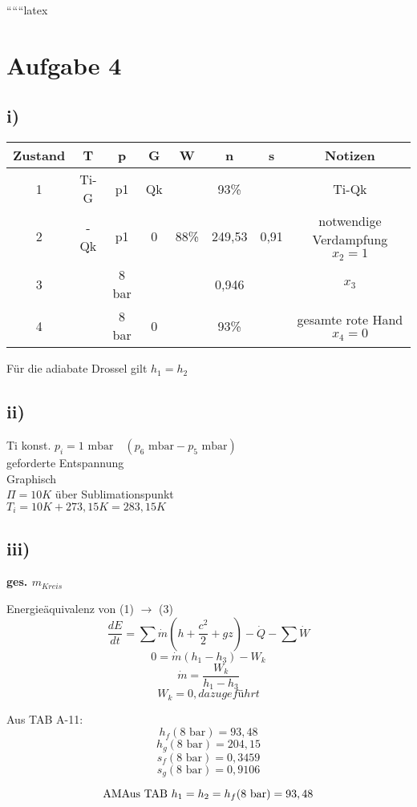 
``````latex


\section*{Aufgabe 4}

\subsection*{i)}
\begin{tabular}{|c|c|c|c|c|c|c|c|}
\hline
Zustand & T & p & G & W & n & s & Notizen \\
\hline
1 & Ti-G & p1 & Qk & & 93\% & & Ti-Qk \\
\hline
2 & -Qk & p1 & 0 & 88\% & 249,53 & 0,91 & notwendige Verdampfung $x_2 = 1$ \\
\hline
3 & & 8 bar & & & 0,946 & & $x_3$ \\
\hline
4 & & 8 bar & 0 & & 93\% & & gesamte rote Hand $x_4 = 0$ \\
\hline
\end{tabular}

Für die adiabate Drossel gilt $h_1 = h_2$

\subsection*{ii)}
Ti konst. $p_i = 1 \text{ mbar} \quad (p_6 \text{ mbar} - p_5 \text{ mbar})$ \\
geforderte Entspannung \\
Graphisch \\
$\Pi = 10 K$ über Sublimationspunkt \\
$T_i = 10 K + 273,15 K = 283,15 K$

\subsection*{iii)}
\textbf{ges. $m_{Kreis}$}

Energieäquivalenz von (1) $\rightarrow$ (3)
\[
\frac{dE}{dt} = \sum \dot{m} (h + \frac{c^2}{2} + gz) - \dot{Q} - \sum \dot{W}
\]
\[
0 = \dot{m} (h_1 - h_3) - W_k
\]
\[
\dot{m} = \frac{W_k}{h_1 - h_3}
\]
\[
W_k = 0, da zugeführt
\]

Aus TAB A-11: \\
\[
h_f (8 \text{ bar}) = 93,48
\]
\[
h_g (8 \text{ bar}) = 204,15
\]
\[
s_f (8 \text{ bar}) = 0,3459
\]
\[
s_g (8 \text{ bar}) = 0,9106
\]

\[
\text{AM} \\
\text{Aus TAB } h_1 = h_2 = h_f (8 \text{ bar}) = 93,48
\]

